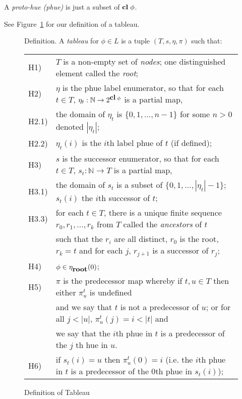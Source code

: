 \documentclass[submission,copyright,creativecommons]{eptcs}
\newcommand{\natn}{\mathbb{N}}
\newcommand{\clos}{\mbox{{\bf cl}}\;}
\newcommand{\lang}{L}
\newenvironment{definition}{Definition. }{}
\begin{document}
A {\em proto-hue (phue)} is just a subset of $\clos \phi$.

See Figure~\ref{fig:tab}
for our definition of a tableau.


\begin{figure}
\begin{definition}
A {\em tableau} for $\phi \in \lang$
is a tuple
$(T, s, \eta,\pi)$ such that:\\
\begin{tabular}{ll}
H1) &  $T$ is a non-empty set of {\em nodes}; one distinguished element called the {\em root};\\
H2) & $\eta$ is the phue label enumerator, so that  for each $t \in T$, $\eta_t: \natn \rightarrow 2^{\clos{\phi}}$ is a partial map, \\
H2.1) & the domain of $\eta_t$ is $\{ 0, 1, ..., n-1 \}$ for some $n>0$ denoted $|\eta_t|$;\\
 H2.2)  & $\eta_t(i)$ is the $i$th label phue of $t$ (if defined);\\
H3) & $s$ is the successor enumerator, so that
      for each $t \in T$, $s_t: \natn \rightarrow T$ is a partial map,\\
H3.1) &
the domain of $s_t$ is a subset of $\{ 0, 1, ..., |\eta_t|-1 \}$;
  $s_t(i)$ the $i$th successor of $t$;\\
 H3.3) & for each $t \in T$, there is a unique finite sequence $r_0, r_1, ..., r_k$ from $T$ 
 called the {\em ancestors} of $t$\\&
            such that  the $r_i$ are all distinct,
            $r_0$ is the root, $r_k=t$ and for each $j$, $r_{j+1}$ is a successor of $r_j$;\\
H4) & $\phi \in \eta_{\mbox{\bf root}}(0)$;\\
H5) & $\pi$ is the predecessor map whereby if $t,u \in T$ then either $\pi^t_u$ is undefined\\&
and we say that $t$ is not a predecessor of $u$; or for all $j < |u|$, $\pi^t_u(j)=i<|t|$ and\\
& we say that the $i$th phue in $t$ is a predecessor of the
$j$ th hue in $u$.\\
H6) & if $s_t(i)=u$ then 
$\pi^t_u(0)=i$ (i.e. the $i$th phue in $t$ is a predecessor of the $0$th phue in $s_t(i)$);\\
\end{tabular}

\end{definition}
\caption{Definition of Tableau}
\label{fig:tab}

\end{figure}
\end{document}
